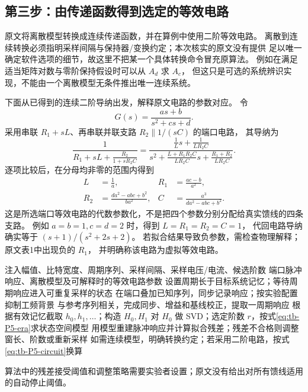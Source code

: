 \subsection{第三步：由传递函数得到选定的等效电路}
原文将离散模型转换成连续传递函数，并在算例中使用二阶等效电路。
离散到连续转换必须指明采样间隔与保持器/变换约定；本次核实的原文没有提供
足以唯一确定软件选项的细节，故这里不把某一个具体转换命令冒充原算法。
例如在满足适当矩阵对数与零阶保持假设时可以从 $A_d$ 求 $A_c$，
但这只是可选的系统辨识实现，不能由一个离散模型无条件推出唯一连续系统。

下面从已得到的连续二阶导纳出发，解释原文电路的参数对应。
令
\[
 G(s)=\frac{as+b}{s^2+cs+d}.
\]
采用串联 $R_1+sL$、再串联并联支路 $R_2\parallel1/(sC)$ 的端口电路，
其导纳为
\[
 \frac1{R_1+sL+\frac{R_2}{1+sR_2C}}
 =
 \frac{\frac1L s+\frac1{LR_2C}}
 {s^2+\frac{L+R_1R_2C}{LR_2C}s+\frac{R_1+R_2}{LR_2C}}.
\]
逐项比较后，在分母均非零的范围内得到
\begin{equation}\label{eq:tb-P5-circuit}
 \begin{aligned}
 L&=\frac1a,&
 R_1&=\frac{ac-b}{a^2},\\
 R_2&=\frac{da^2-abc+b^2}{ba^2},&
 C&=\frac{a^3}{da^2-abc+b^2}.
 \end{aligned}
\end{equation}
这是所选端口等效电路的代数参数化，不是把四个参数分别分配给真实馈线的四条支路。
例如 $a=b=1,c=d=2$ 时，得到 $L=R_1=R_2=C=1$，
代回电路导纳确实等于 $(s+1)/(s^2+2s+2)$。
若拟合结果导致负参数，需检查物理解释；原文表1中出现负的 $R_1$，
并明确称该电路为虚拟等效电路。

\begin{algorithm}[htbp]
\caption{P5 的脉冲压缩到端口模型主线}
\label{alg:tb-P5}
\begin{algorithmic}[1]
\Require 注入幅值、比特宽度、周期序列、采样间隔、采样电压/电流、候选阶数
\Ensure 端口脉冲响应、离散模型及可解释时的等效电路参数
\State 设置周期长于目标系统记忆；等待周期响应进入可重复采样的状态
\State 在端口叠加已知序列，同步记录响应；按实验配置抑制工频背景
\State 与参考序列相关，完成同步、增益和基线校正，提取一周期响应
\State 根据有效记忆截取 $h_0,h_1,\ldots$；构造 $H_0,H_1$
\State 对 $H_0$ 做 SVD；选定阶数 $r$，按式\eqref{eq:tb-P5-era}求状态空间模型
\State 用模型重建脉冲响应并计算拟合残差；残差不合格则调整窗长、阶数或重新采样
\State 如需连续模型，明确转换约定；若采用二阶电路，按式\eqref{eq:tb-P5-circuit}换算
\end{algorithmic}
\end{algorithm}
算法中的残差接受阈值和调整策略需要实验者设置；原文没有给出对所有馈线适用的自动停止阈值。

